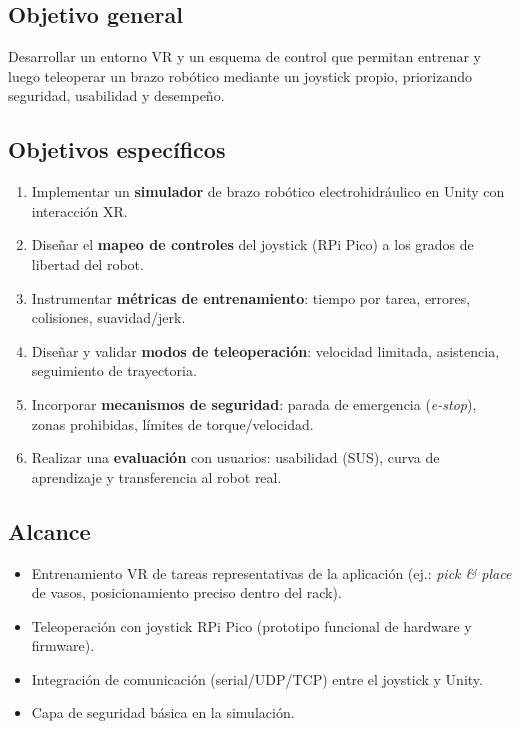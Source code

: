 \subsection{Objetivo general}

Desarrollar un entorno VR y un esquema de control que permitan entrenar y luego teleoperar un brazo robótico mediante un joystick propio, priorizando seguridad, usabilidad y desempeño.

\subsection{Objetivos específicos}

\begin{enumerate}
    \item Implementar un \textbf{simulador} de brazo robótico electrohidráulico en Unity con interacción XR.
    \item Diseñar el \textbf{mapeo de controles} del joystick (RPi Pico) a los grados de libertad del robot.
    \item Instrumentar \textbf{métricas de entrenamiento}: tiempo por tarea, errores, colisiones, suavidad/jerk.
    \item Diseñar y validar \textbf{modos de teleoperación}: velocidad limitada, asistencia, seguimiento de trayectoria.
    \item Incorporar \textbf{mecanismos de seguridad}: parada de emergencia (\textit{e-stop}), zonas prohibidas, límites de torque/velocidad.
    \item Realizar una \textbf{evaluación} con usuarios: usabilidad (SUS), curva de aprendizaje y transferencia al robot real.
\end{enumerate}

\subsection{Alcance}

\begin{itemize}
    \item Entrenamiento VR de tareas representativas de la aplicación (ej.: \textit{pick \& place} de vasos, posicionamiento preciso dentro del rack).
    \item Teleoperación con joystick RPi Pico (prototipo funcional de hardware y firmware).
    \item Integración de comunicación (serial/UDP/TCP) entre el joystick y Unity.
    \item Capa de seguridad básica en la simulación.
\end{itemize}

